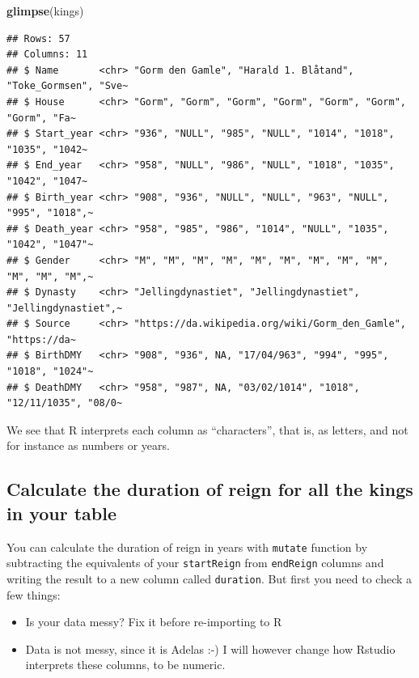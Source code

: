 \documentclass[
]{article}
\newenvironment{Shaded}{\begin{snugshade}}{\end{snugshade}}
\newcommand{\FunctionTok}[1]{\textcolor[rgb]{0.13,0.29,0.53}{\textbf{#1}}}
\newcommand{\NormalTok}[1]{#1}
\providecommand{\tightlist}{%
  \setlength{\itemsep}{0pt}\setlength{\parskip}{0pt}}
\begin{document}
\begin{Shaded}
\begin{Highlighting}[]
\FunctionTok{glimpse}\NormalTok{(kings)}
\end{Highlighting}
\end{Shaded}

\begin{verbatim}
## Rows: 57
## Columns: 11
## $ Name       <chr> "Gorm den Gamle", "Harald 1. Blåtand", "Toke_Gormsen", "Sve~
## $ House      <chr> "Gorm", "Gorm", "Gorm", "Gorm", "Gorm", "Gorm", "Gorm", "Fa~
## $ Start_year <chr> "936", "NULL", "985", "NULL", "1014", "1018", "1035", "1042~
## $ End_year   <chr> "958", "NULL", "986", "NULL", "1018", "1035", "1042", "1047~
## $ Birth_year <chr> "908", "936", "NULL", "NULL", "963", "NULL", "995", "1018",~
## $ Death_year <chr> "958", "985", "986", "1014", "NULL", "1035", "1042", "1047"~
## $ Gender     <chr> "M", "M", "M", "M", "M", "M", "M", "M", "M", "M", "M", "M",~
## $ Dynasty    <chr> "Jellingdynastiet", "Jellingdynastiet", "Jellingdynastiet",~
## $ Source     <chr> "https://da.wikipedia.org/wiki/Gorm_den_Gamle", "https://da~
## $ BirthDMY   <chr> "908", "936", NA, "17/04/963", "994", "995", "1018", "1024"~
## $ DeathDMY   <chr> "958", "987", NA, "03/02/1014", "1018", "12/11/1035", "08/0~
\end{verbatim}

We see that R interprets each column as ``characters'', that is, as
letters, and not for instance as numbers or years.

\subsection{Calculate the duration of reign for all the kings in your
table}\label{calculate-the-duration-of-reign-for-all-the-kings-in-your-table}

You can calculate the duration of reign in years with \texttt{mutate}
function by subtracting the equivalents of your \texttt{startReign} from
\texttt{endReign} columns and writing the result to a new column called
\texttt{duration}. But first you need to check a few things:

\begin{itemize}
\tightlist
\item
  Is your data messy? Fix it before re-importing to R
\item
  Data is not messy, since it is Adelas :-) I will however change how
  Rstudio interprets these columns, to be numeric.
\end{itemize}
\end{document}
